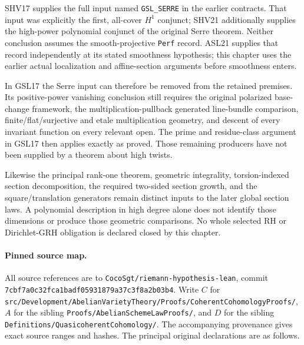 \documentclass[11pt,a4paper]{article}
\numberwithin{equation}{section}
\theoremstyle{remark}\newtheorem{remark}[theorem]{Remark}
\begin{document}
SHV17 supplies the full input named \texttt{GSL\_\allowbreak SERRE} in
the earlier contracts.  That input was explicitly the first,
all-cover $H^1$ conjunct; SHV21 additionally supplies the
high-power polynomial conjunct of the original Serre theorem.
Neither conclusion assumes the smooth-projective \texttt{Perf}
record.  ASL21 supplies that record independently at its stated
smoothness hypothesis; this chapter uses the earlier actual
localization and affine-section arguments before smoothness enters.

In GSL17 the Serre input can therefore be removed from the retained
premises.  Its positive-power vanishing conclusion still requires the
original polarized base-change framework, the multiplication-pullback
generated line-bundle comparison, finite/flat/surjective and etale
multiplication geometry, and descent of every invariant function on
every relevant open.  The prime and residue-class argument in GSL17
then applies exactly as proved.  Those remaining producers have not
been supplied by a theorem about high twists.

Likewise the principal rank-one theorem, geometric integrality,
torsion-indexed section decomposition, the required two-sided section
growth, and the square/translation generators remain distinct inputs
to the later global section laws.  A polynomial description in high
degree alone does not identify those dimensions or produce those
geometric comparisons.  No whole selected RH or Dirichlet-GRH
obligation is declared closed by this chapter.

\paragraph{Pinned source map.}
All source references are to
\texttt{Coco\allowbreak Sgt/\allowbreak riemann-hypothesis-lean}, commit
\texttt{7cbf7a0c32fca1badf05931879a37c3f8a2b03b4}.
Write $C$ for
\texttt{src/\allowbreak Development/\allowbreak Abelian\allowbreak Variety\allowbreak Theory/\allowbreak Proofs/\allowbreak Coherent\allowbreak Cohomology\allowbreak Proofs/\allowbreak },
$A$ for the sibling
\texttt{Proofs/\allowbreak Abelian\allowbreak Scheme\allowbreak Law\allowbreak Proofs/\allowbreak }, and $D$ for the sibling
\texttt{Definitions/\allowbreak Quasicoherent\allowbreak Cohomology/\allowbreak }.
The accompanying provenance gives exact source ranges and hashes.
The principal original declarations are as follows.
\end{document}
